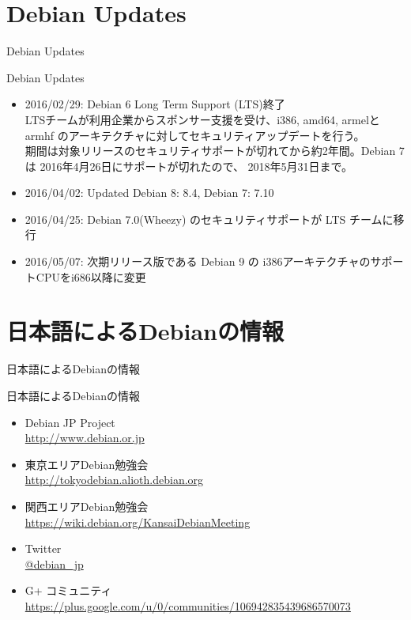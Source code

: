 \section{Debian Updates}
\begin{frame}\begin{center}\Huge{Debian Updates}\end{center}\end{frame}

\begin{frame}{Debian Updates}%

\begin{itemize}[<+->]
\item 2016/02/29: Debian 6 Long Term Support (LTS)終了\\
   \pause \small{LTSチームが利用企業からスポンサー支援を受け、i386, amd64, armelとarmhf
   のアーキテクチャに対してセキュリティアップデートを行う。\\
   期間は対象リリースのセキュリティサポートが切れてから約2年間。Debian 7 は 2016年4月26日にサポートが切れたので、
   2018年5月31日まで。}
   \pause
\item 2016/04/02: Updated Debian 8: 8.4, Debian 7: 7.10
\item 2016/04/25: Debian 7.0(Wheezy) のセキュリティサポートが LTS チームに移行
\item 2016/05/07: 次期リリース版である Debian 9 の i386アーキテクチャのサポートCPUをi686以降に変更
\end{itemize}

\end{frame}

\section{日本語によるDebianの情報}
\begin{frame}\begin{center}\Huge{日本語によるDebianの情報}\end{center}\end{frame}

\begin{frame}{日本語によるDebianの情報}
\begin{itemize}
  \item Debian JP Project \\
      \url{http://www.debian.or.jp}
  \item 東京エリアDebian勉強会\\
      \url{http://tokyodebian.alioth.debian.org}
  \item 関西エリアDebian勉強会 \\
      \url{https://wiki.debian.org/KansaiDebianMeeting}
  \item Twitter \\
      \url{@debian_jp}
  \item G+ コミュニティ \\
      \url{https://plus.google.com/u/0/communities/106942835439686570073}
 
\end{itemize}
\end{frame}

